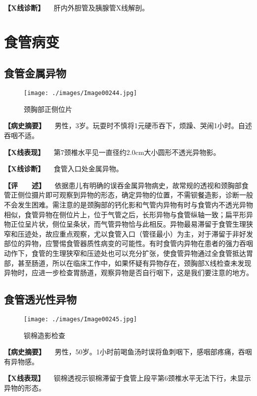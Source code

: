 \textbf{【X线诊断】} 　肝内外胆管及胰腺管X线解剖。

\section{食管病变}

\subsection{食管金属异物}

\begin{figure}[!htbp]
 \centering
 \texttt{[image: ./images/Image00244.jpg]}
 \captionsetup{justification=centering}
 \caption{颈胸部正侧位片}
 \label{fig5-2-1}
  \end{figure} 

\textbf{【病史摘要】}
　男性，3岁。玩耍时不慎将1元硬币吞下，烦躁、哭闹1小时。自述吞咽不适。

\textbf{【X线表现】} 　第7颈椎水平见一直径约2.0cm大小圆形不透光异物影。

\textbf{【X线诊断】} 　食管入口处金属异物。

\textbf{【评　　述】}
　依据患儿有明确的误吞金属异物病史，故常规的透视和颈胸部食管正侧位摄片即可观察到异物的形态，确定异物的位置，不需钡餐造影，诊断一般不会发生困难。需注意的是颈胸部的钙化影和气管内异物有时与食管内不透光异物相似，食管异物在侧位片上，位于气管之后，长形异物与食管纵轴一致；扁平形异物正位呈片状，侧位呈条状，而气管异物恰与此相反。异物最易滞留于食管生理狭窄和压迹处，故应重点观察，尤以食管入口（管径最小）为主，对于滞留于非好发部位的异物，应警惕食管器质性病变的可能性。有时食管内异物在患者的强力吞咽动作下，食管的生理狭窄和压迹处也可以充分扩张，使食管异物通过全食管抵达胃部，甚至肠道，所以在临床工作中，如果怀疑有异物存在，颈胸部X线检查未发现异物时，应进一步检查胃肠道，观察异物是否自行咽下，这是我们要注意的地方。

\subsection{食管透光性异物}

\begin{figure}[!htbp]
 \centering
 \texttt{[image: ./images/Image00245.jpg]}
 \captionsetup{justification=centering}
 \caption{钡棉造影检查}
 \label{fig5-2-2}
  \end{figure} 

\textbf{【病史摘要】}
　男性，50岁。1小时前喝鱼汤时误将鱼刺咽下，感咽部疼痛，吞咽有异物感。

\textbf{【X线表现】}
　钡棉透视示钡棉滞留于食管上段平第6颈椎水平无法下行，未显示异物的形态。


